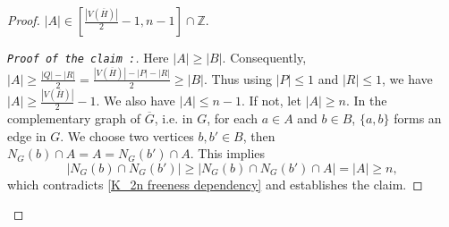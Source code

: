 \documentclass[10pt,a4paper]{amsart}
\begin{document}
\begin{proof}
  $|A|\in\left[\frac{|V(\overline{H})|}{2}-1,n-1\right]\cap\mathbb{Z}$.
\begin{proof}[\tt{Proof of the claim} :]\renewcommand{\qedsymbol}{}
Here $|A|\geq|B|$. Consequently, $|A|\geq\frac{|Q|-|R|}{2}=\frac{|V(\overline{H})|-|P|-|R|}{2}\geq|B|$. Thus using $|P|\leq1$ and $|R|\leq1$, we have $|A|\geq\frac{|V(\overline{H})|}{2}-1$. We also have $|A|\leq n-1$. If not, let $|A|\geq n$. In the complementary graph of $\overline{G}$, i.e. in $G$, for each $a\in A$ and $b\in B$, $\{a,b\}$ forms an edge in $G$. We choose two vertices $b,b'\in B$, then $N_{G}(b)\cap A=A=N_{G}(b')\cap A$. This implies 
\begin{equation*}
 |N_{G}(b)\cap N_{G}(b')|\geq|N_{G}(b)\cap N_{G}(b')\cap A|=|A|\geq n,   
\end{equation*}
which contradicts \eqref{K_2n freeness dependency} and establishes the claim. 
\end{proof}


\end{proof}
\end{document}
